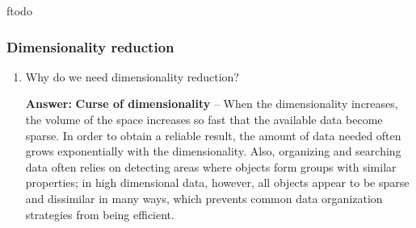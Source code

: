 ƒtodo\documentclass{article}
\newenvironment{QandA}{\begin{enumerate}[label=\arabic*.]}{\end{enumerate}}
\newenvironment{answer}{\par\normalfont \textbf{Answer:}}{}
\begin{document}
\subsubsection{Dimensionality reduction}
\begin{QandA}
    \item Why do we need dimensionality reduction?
    \begin{answer}
        \textbf{Curse of dimensionality} -- When the dimensionality increases, the volume of the space increases so fast that the available data become sparse. In order to obtain a reliable result, the amount of data needed often grows exponentially with the dimensionality. Also, organizing and searching data often relies on detecting areas where objects form groups with similar properties; in high dimensional data, however, all objects appear to be sparse and dissimilar in many ways, which prevents common data organization strategies from being efficient.
    \end{answer}


\end{QandA}
\end{document}
